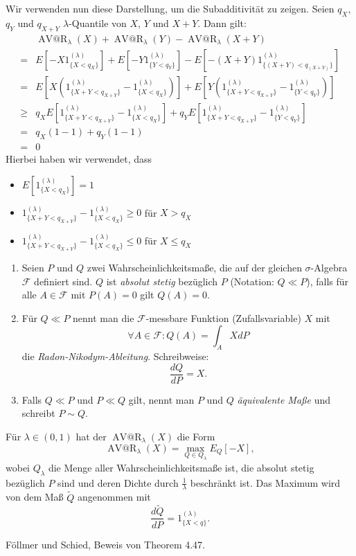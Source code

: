 \documentclass[a4paper,twoside,DIV15,BCOR12mm]{scrbook}
\makeatletter
\newcommand{\cF}{\mathcal F}
\DeclareMathOperator{\AVatR}{AV@R}
\makeatother
\begin{document}
\begin{beweis}
Wir verwenden nun diese Darstellung, um die Subadditivität zu zeigen. Seien $q_X$, $q_Y$ und $q_{X+Y}$ $\lambda$-Quantile von $X$, $Y$ und $X+Y$. Dann gilt:
\begin{align*}
&\AVatR_\lambda(X) + \AVatR_\lambda(Y) - \AVatR_\lambda(X+Y) \\
=&E[-X 1_{\{X<q_X\}}^{(\lambda)}] + E[-Y 1_{\{Y<q_Y\}}^{(\lambda)}] - E[-(X+Y) 1_{\{(X+Y)<q_{(X+Y)}\}}^{(\lambda)}]\\
=&E[X(1_{\{X+Y<q_{X+Y}\}}^{(\lambda)} - 1_{\{X<q_X\}}^{(\lambda)})]
+ E[Y(1_{\{X+Y<q_{X+Y}\}}^{(\lambda)} - 1_{\{Y<q_Y\}}^{(\lambda)})] \\
\ge& q_X E[1_{\{X+Y<q_{X+Y}\}}^{(\lambda)} - 1_{\{X<q_X\}}^{(\lambda)}]
+ q_Y E[1_{\{X+Y<q_{X+Y}\}}^{(\lambda)} - 1_{\{Y<q_Y\}}^{(\lambda)}] \\
=& q_X(1-1) + q_Y(1-1)\\
=& 0
\end{align*}
Hierbei haben wir verwendet, dass
\begin{itemize}
\item $E[1_{\{X<q_X\}}^{(\lambda)}] = 1$ 
\item $1_{\{X+Y<q_{X+Y}\}}^{(\lambda)} - 1_{\{X<q_X\}}^{(\lambda)} \ge 0$ für $X>q_X$
\item $1_{\{X+Y<q_{X+Y}\}}^{(\lambda)} - 1_{\{X<q_X\}}^{(\lambda)} \le 0$ für $X\le q_X$
\end{itemize}
\end{beweis}

\begin{bemerkung}
\begin{enumerate}
\item Seien $P$ und $Q$ zwei Wahrscheinlichkeitsmaße, die auf der gleichen $\sigma$-Algebra $\cF$ definiert sind. $Q$ ist \emph{absolut stetig} bezüglich $P$ (Notation: $Q\ll P$), falls für alle $A\in\cF$ mit $P(A)=0$ gilt $Q(A)=0$.
\item Für $Q\ll P$ nennt man die $\cF$-messbare Funktion (Zufallsvariable) $X$ mit 
\[
\forall A\in\cF: Q(A) = \int_A X dP
\]
die \emph{Radon-Nikodym-Ableitung}. Schreibweise:
\[
\frac{dQ}{dP} = X.
\]
\item Falls $Q\ll P$ und $P\ll Q$ gilt, nennt man $P$ und $Q$ \emph{äquivalente Maße} und schreibt $P\sim Q$.
\end{enumerate}
\end{bemerkung}

\begin{satz}
Für $\lambda\in(0, 1)$ hat der $\AVatR_\lambda(X)$ die Form
\[
\AVatR_\lambda(X) = \max_{Q\in Q_\lambda}E_Q[-X],
\]
wobei $Q_\lambda$ die Menge aller Wahrscheinlichkeitsmaße ist, die absolut stetig bezüglich $P$ sind und deren Dichte durch $\frac1\lambda$ beschränkt ist. Das Maximum wird von dem Maß $\tilde Q$ angenommen mit
\[
\frac{d\tilde Q}{dP} = 1_{\{X<q\}}^{(\lambda)}.
\]
\end{satz}
\begin{beweis}
Föllmer und Schied, Beweis von Theorem 4.47.
\end{beweis}
\end{document}
